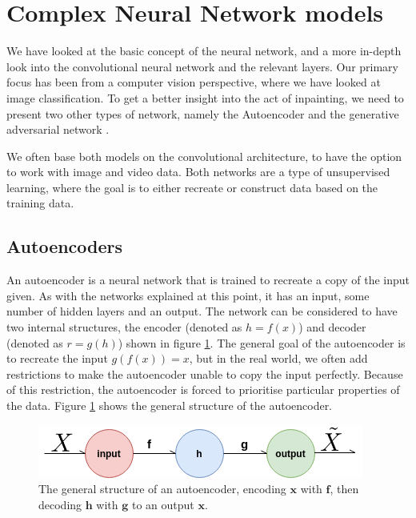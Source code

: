 \section{Complex Neural Network models}
We have looked at the basic concept of the neural network, and a more in-depth look into the convolutional neural network and the relevant layers.
Our primary focus has been from a computer vision perspective, where we have looked at image classification. 
To get a better insight into the act of inpainting, we need to present two other types of network, namely the Autoencoder \cite{Rumelhart:1986:LIR:104279.104293} and the generative adversarial network \cite{Goodfellow:2014:GAN:2969033.2969125}.

We often base both models on the convolutional architecture, to have the option to work with image and video data. 
Both networks are a type of unsupervised learning, where the goal is to either recreate or construct data based on the training data.



\subsection{Autoencoders}
\label{cha:Explaining_autoencoders}
 An autoencoder is a neural network that is trained to recreate a copy of the input given. 
As with the networks explained at this point, it has an input, some number of hidden layers and an output. The network can be considered to have two internal structures, the encoder (denoted as $h=f(x)$) and decoder (denoted as $r=g(h)$) shown in figure \ref{fig:simpleAE}.
The general goal of the autoencoder is to recreate the input $g(f(x)) = x$, but in the real world, we often add restrictions to make the autoencoder unable to copy the input perfectly. Because of this restriction, the autoencoder is forced to prioritise particular properties of the data. Figure \ref{fig:simpleAE} shows the general structure of the autoencoder.

\begin{figure}
    \centering
    \includegraphics[scale=0.6]{background/figures/SimpleAE.png}
    \caption{The general structure of an autoencoder, encoding $\textbf{x}$ with $\textbf{f}$, then decoding $\textbf{h}$ with $\textbf{g}$ to an output $\textbf{x}$.}
    \label{fig:simpleAE}
\end{figure}

